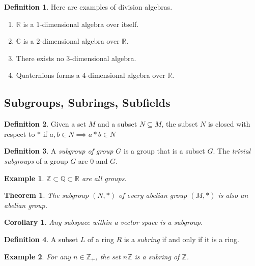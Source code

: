 \documentclass{article}
\newtheorem{theorem}{Theorem}[section]
\newtheorem{example}{Example}[section]
\newtheorem{corollary}{Corollary}[theorem]
\theoremstyle{remark}
\theoremstyle{definition}
\newtheorem{definition}{Definition}[section]
\begin{document}
\begin{definition}
Here are examples of division algebras.
\begin{enumerate}
    \item $\mathbb{R}$ is a $1$-dimensional algebra over itself. 
    \item $\mathbb{C}$ is a $2$-dimensional algebra over $\mathbb{R}$. 
    \item There exists no $3$-dimensional algebra. 
    \item Quaternions forms a $4$-dimensional algebra over $\mathbb{R}$. 
\end{enumerate}
\end{definition}

\subsection{Subgroups, Subrings, Subfields}

\begin{definition}
Given a set $M$ and a subset $N \subseteq M$, the subset $N$ is closed with respect to $*$ if $a, b \in N \implies a * b \in N$
\end{definition}

\begin{definition}
A \textit{subgroup of group $G$} is a group that is a subset $G$. The \textit{trivial subgroups} of a group $G$ are $0$ and $G$. 
\end{definition}

\begin{example}
$\mathbb{Z} \subset \mathbb{Q} \subset \mathbb{R}$ are all groups. 
\end{example}

\begin{theorem}
The subgroup $(N, *)$ of every abelian group $(M, *)$ is also an abelian group. 
\end{theorem}

\begin{corollary}
Any subspace within a vector space is a subgroup. 
\end{corollary}

\begin{definition}
A subset $L$ of a ring $R$ is a \textit{subring} if and only if it is a ring. 
\end{definition}

\begin{example}
For any $n \in \mathbb{Z}_{+}$, the set $n\mathbb{Z}$ is a subring of $\mathbb{Z}$. 
\end{example}
\end{document}
